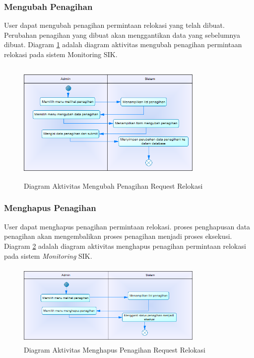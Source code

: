 	\subsubsection{Mengubah Penagihan}
	User dapat mengubah penagihan permintaan relokasi yang telah dibuat. Perubahan penagihan yang dibuat akan menggantikan data yang sebelumnya dibuat. Diagram \ref{figure:activity_mengubah_penagihan} adalah diagram aktivitas mengubah penagihan permintaan relokasi pada sistem Monitoring SIK.
	\begin{figure}[h]
	\centerline {\includegraphics[width=9cm,height=6cm]{bab4/ActivityDiagram_MengubahPenagihan.png}}
	\caption{Diagram Aktivitas Mengubah Penagihan Request Relokasi}
	\label{figure:activity_mengubah_penagihan}
	\end{figure}
	
	\subsubsection{Menghapus Penagihan}
	User dapat menghapus penagihan permintaan relokasi. proses penghapusan data penagihan akan mengembalikan proses penagihan menjadi proses eksekusi. Diagram \ref{figure:activity_menghapus_penagihan} adalah diagram aktivitas menghapus penagihan permintaan relokasi pada sistem \textit{Monitoring} SIK.
	\begin{figure}[h]
	\centerline {\includegraphics[width=9cm,height=4cm]{bab4/ActivityDiagram_MenghapusPenagihan.png}}
	\caption{Diagram Aktivitas Menghapus Penagihan Request Relokasi}
	\label{figure:activity_menghapus_penagihan}
	\end{figure}		

